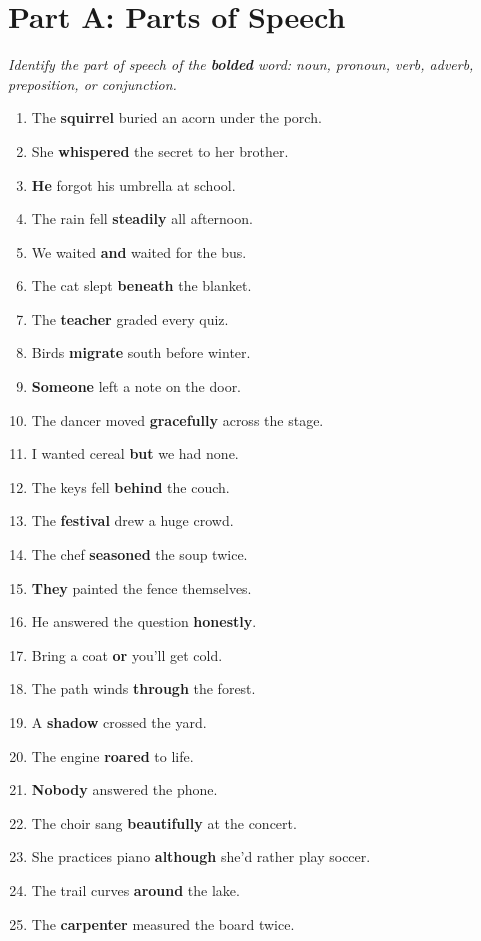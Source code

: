 \documentclass[11pt]{article}
\newcommand{\ansline}{\underline{\hspace{1.1in}}}
\begin{document}
\section*{Part A: Parts of Speech}
\noindent\textit{Identify the part of speech of the \textbf{bolded} word: noun, pronoun, verb, adverb, preposition, or conjunction.}
\begin{enumerate}
  \item The \textbf{squirrel} buried an acorn under the porch. \ansline
  \item She \textbf{whispered} the secret to her brother. \ansline
  \item \textbf{He} forgot his umbrella at school. \ansline
  \item The rain fell \textbf{steadily} all afternoon. \ansline
  \item We waited \textbf{and} waited for the bus. \ansline
  \item The cat slept \textbf{beneath} the blanket. \ansline
  \item The \textbf{teacher} graded every quiz. \ansline
  \item Birds \textbf{migrate} south before winter. \ansline
  \item \textbf{Someone} left a note on the door. \ansline
  \item The dancer moved \textbf{gracefully} across the stage. \ansline
  \item I wanted cereal \textbf{but} we had none. \ansline
  \item The keys fell \textbf{behind} the couch. \ansline
  \item The \textbf{festival} drew a huge crowd. \ansline
  \item The chef \textbf{seasoned} the soup twice. \ansline
  \item \textbf{They} painted the fence themselves. \ansline
  \item He answered the question \textbf{honestly}. \ansline
  \item Bring a coat \textbf{or} you'll get cold. \ansline
  \item The path winds \textbf{through} the forest. \ansline
  \item A \textbf{shadow} crossed the yard. \ansline
  \item The engine \textbf{roared} to life. \ansline
  \item \textbf{Nobody} answered the phone. \ansline
  \item The choir sang \textbf{beautifully} at the concert. \ansline
  \item She practices piano \textbf{although} she'd rather play soccer. \ansline
  \item The trail curves \textbf{around} the lake. \ansline
  \item The \textbf{carpenter} measured the board twice. \ansline
\end{enumerate}
\end{document}
